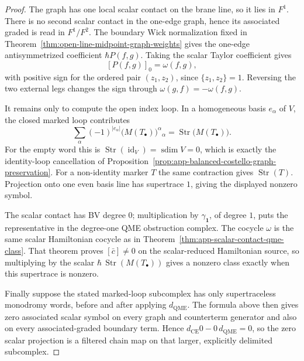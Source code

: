 \begin{proof}
  The graph has one local scalar contact on the brane line, so it lies in
  \(F^1\).  There is no second scalar contact in the one-edge graph, hence
  its associated graded is read in \(F^1/F^2\).  The boundary Wick
  normalization fixed in
  Theorem~\ref{thm:open-line-midpoint-graph-weights} gives the one-edge
  antisymmetrized coefficient \(\hbar P(f,g)\).  Taking the scalar
  Taylor coefficient gives
  \[
    [P(f,g)]_0=\omega(f,g),
  \]
  with positive sign for the ordered pair \((z_1,z_2)\), since
  \(\{z_1,z_2\}=1\).  Reversing the two external legs changes the sign
  through \(\omega(g,f)=-\omega(f,g)\).

  It remains only to compute the open index loop.  In a homogeneous basis
  \(e_\alpha\) of \(V\), the closed marked loop contributes
  \[
    \sum_\alpha (-1)^{|e_\alpha|}
      \bigl(M(T_\bullet)\bigr)^\alpha{}_\alpha
      =
    \operatorname{Str}\!\bigl(M(T_\bullet)\bigr).
  \]
  For the empty word this is
  \(\operatorname{Str}(\operatorname{id}_V)=\operatorname{sdim}V=0\),
  which is exactly the identity-loop cancellation of
  Proposition~\ref{prop:app-balanced-costello-graph-preservation}.  For a
  non-identity marker \(T\) the same contraction gives
  \(\operatorname{Str}(T)\).  Projection onto one even basis line has
  supertrace \(1\), giving the displayed nonzero symbol.

  The scalar contact has BV degree \(0\); multiplication by
  \(\gamma_{\mathbf 1}\), of degree \(1\), puts the representative in the
  degree-one QME obstruction complex.  The cocycle \(\omega\) is the same
  scalar Hamiltonian cocycle as in
  Theorem~\ref{thm:app-scalar-contact-qme-class}.  That theorem proves
  \([\bar c]\neq0\) on the scalar-reduced Hamiltonian source, so multiplying
  by the scalar
  \(\hbar\,\operatorname{Str}(M(T_\bullet))\) gives a nonzero class
  exactly when this supertrace is nonzero.

  Finally suppose the stated marked-loop subcomplex has only
  supertraceless monodromy words, before and after applying
  \(d_{\mathrm{QME}}\).  The formula above then gives zero associated
  scalar symbol on every graph and counterterm generator and also on
  every associated-graded boundary term.  Hence
  \(d_{\mathrm{CE}}0-0\,d_{\mathrm{QME}}=0\), so the zero scalar projection
  is a filtered chain map on that larger, explicitly delimited subcomplex.
\end{proof}

